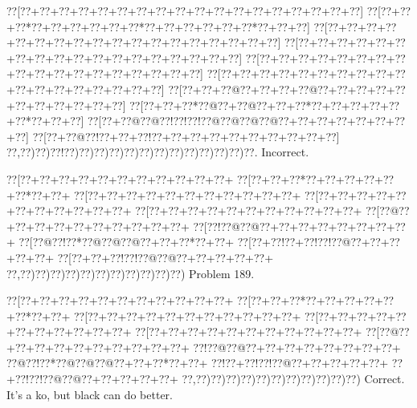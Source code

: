 \documentclass[a5paper]{article}
\begin{document}
\begin{center}
{\goo
\0??[\0??+\0??+\0??+\0??+\0??+\0??+\0??+\0??+\0??+\0??+\0??+\0??+\0??+\0??+\0??+\0??+\0??+\0??]
\0??[\0??+\0??+\0??*\0??+\0??+\0??+\0??+\0??+\0??*\0??+\0??+\0??+\0??+\0??+\0??*\0??+\0??+\0??]
\0??[\0??+\0??+\0??+\0??+\0??+\0??+\0??+\0??+\0??+\0??+\0??+\0??+\0??+\0??+\0??+\0??+\0??+\0??]
\0??[\0??+\0??+\0??+\0??+\0??+\0??+\0??+\0??+\0??+\0??+\0??+\0??+\0??+\0??+\0??+\0??+\0??+\0??]
\0??[\0??+\0??+\0??+\0??+\0??+\0??+\0??+\0??+\0??+\0??+\0??+\0??+\0??+\0??+\0??+\0??+\0??+\0??]
\0??[\0??+\0??+\0??+\0??+\0??+\0??+\0??+\0??+\0??+\0??+\0??+\0??+\0??+\0??+\0??+\0??+\0??+\0??]
\0??[\0??+\0??+\0??@\0??+\0??+\0??+\0??@\0??+\0??+\0??+\0??+\0??+\0??+\0??+\0??+\0??+\0??+\0??]
\0??[\0??+\0??+\0??*\0??@\0??+\0??@\0??+\0??+\0??*\0??+\0??+\0??+\0??+\0??+\0??*\0??+\0??+\0??]
\0??[\0??+\0??@\0??@\0??!\0??!\0??!\0??@\0??@\0??@\0??@\0??+\0??+\0??+\0??+\0??+\0??+\0??+\0??]
\0??[\0??+\0??@\0??!\0??+\0??+\0??!\0??+\0??+\0??+\0??+\0??+\0??+\0??+\0??+\0??+\0??]
\0??,\0??)\0??)\0??!\0??)\0??)\0??)\0??)\0??)\0??)\0??)\0??)\0??)\0??)\0??)\0??)\0??.
}
Incorrect. 

\end{center}
\newpage
\begin{center}
{\goo
\0??[\0??+\0??+\0??+\0??+\0??+\0??+\0??+\0??+\0??+\0??+\0??+
\0??[\0??+\0??+\0??*\0??+\0??+\0??+\0??+\0??+\0??*\0??+\0??+
\0??[\0??+\0??+\0??+\0??+\0??+\0??+\0??+\0??+\0??+\0??+\0??+
\0??[\0??+\0??+\0??+\0??+\0??+\0??+\0??+\0??+\0??+\0??+\0??+
\0??[\0??+\0??+\0??+\0??+\0??+\0??+\0??+\0??+\0??+\0??+\0??+
\0??[\0??@\0??+\0??+\0??+\0??+\0??+\0??+\0??+\0??+\0??+\0??+
\0??[\0??!\0??@\0??@\0??+\0??+\0??+\0??+\0??+\0??+\0??+\0??+
\0??[\0??@\0??!\0??*\0??@\0??@\0??@\0??+\0??+\0??*\0??+\0??+
\0??[\0??+\0??!\0??+\0??!\0??!\0??@\0??+\0??+\0??+\0??+\0??+
\0??[\0??+\0??+\0??!\0??!\0??@\0??@\0??+\0??+\0??+\0??+\0??+
\0??,\0??)\0??)\0??)\0??)\0??)\0??)\0??)\0??)\0??)\0??)\0??)
}
Problem 189.

\end{center}
\begin{center}
{\goo
\0??[\0??+\0??+\0??+\0??+\0??+\0??+\0??+\0??+\0??+\0??+\0??+
\0??[\0??+\0??+\0??*\0??+\0??+\0??+\0??+\0??+\0??*\0??+\0??+
\0??[\0??+\0??+\0??+\0??+\0??+\0??+\0??+\0??+\0??+\0??+\0??+
\0??[\0??+\0??+\0??+\0??+\0??+\0??+\0??+\0??+\0??+\0??+\0??+
\0??[\0??+\0??+\0??+\0??+\0??+\0??+\0??+\0??+\0??+\0??+\0??+
\0??[\0??@\0??+\0??+\0??+\0??+\0??+\0??+\0??+\0??+\0??+\0??+
\0??!\0??@\0??@\0??+\0??+\0??+\0??+\0??+\0??+\0??+\0??+
\0??@\0??!\0??*\0??@\0??@\0??@\0??+\0??+\0??*\0??+\0??+
\0??!\0??+\0??!\0??!\0??@\0??+\0??+\0??+\0??+\0??+
\0??+\0??!\0??!\0??@\0??@\0??+\0??+\0??+\0??+\0??+
\0??,\0??)\0??)\0??)\0??)\0??)\0??)\0??)\0??)\0??)\0??)\0??)
}
Correct. It's a ko, but black can do better.

\end{center}
\end{document}
